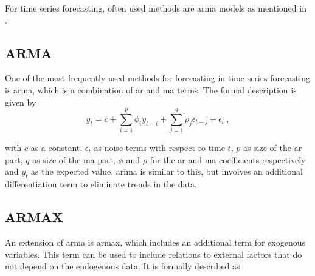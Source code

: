 For time series forecasting, often used methods are \eg \gls{arma} models as mentioned in .\\%

\subsection{ARMA}

One of the most frequently used methods for forecasting in time series forecasting is \gls{arma}, which is a combination of \acrfull{ar} and \gls{ma} terms. The formal description is given by\\

\begin{equation}
y_t = c+\sum_{i=1}^{p}\phi_iy_{t-i}+\sum_{j=1}^{q}\rho_j\epsilon_{t-j}+\epsilon_t~,
\label{eq:arma}
\end{equation}

with $c$ as a constant, $\epsilon_t$ as noise terms with respect to time $t$, $p$ as size of the \gls{ar} part, $q$ as size of the \gls{ma} part, $\phi$ and $\rho$ for the \gls{ar} and \gls{ma} coefficients respectively and $y_t$ as the expected value. \gls{arima} is similar to this, but involves an additional differentiation term to eliminate trends in the data.\\

\subsection{ARMAX}

An extension of \gls{arma} is \gls{armax}, which includes an additional term for exogenous variables. This term can be used to include relations to external factors that do not depend on the endogenous data. It is formally described as\\

